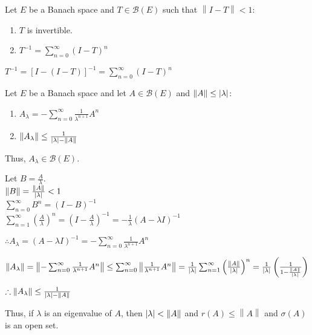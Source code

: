 \documentclass[letterpaper,12pt,fleqn]{article}
\renewcommand{\l}{\lambda}
\renewcommand{\o}{\sigma}
\newcommand{\p}{\rho}
\newcommand{\mb}{\mathcal{B}}
\newcommand{\norm}[1]{\left\|#1\right\|}
\begin{document}
\begin{corollary}
  Let $E$ be a Banach space and $T\in\mb(E)$ such that $\norm{I-T}<1$:
  \begin{enumerate}
  \item $T$ is invertible.
  \item $T^{-1}=\sum_{n=0}^{\infty}(I-T)^n$
  \end{enumerate}
\end{corollary}

\begin{theproof}
  $T^{-1}=[I-(I-T)]^{-1}=\sum_{n=0}^{\infty}(I-T)^n$
\end{theproof}

\begin{theorem}
  Let $E$ be a Banach space and let $A\in\mb(E)$ and $\norm{A}\le\abs{\l}$:
  \begin{enumerate}
  \item $A_{\l}=-\sum_{n=0}^{\infty}\frac{1}{\l^{n+1}}A^n$
  \item $\norm{A_{\l}}\le\frac{1}{\abs{\l}-\norm{A}}$
  \end{enumerate}
  Thus, $A_{\l}\in\mb(E)$.
\end{theorem}

\begin{theproof}
  Let $B=\frac{A}{\l}$. \\
  $\norm{B}=\frac{\norm{A}}{\abs{\l}}<1$ \\
  $\sum_{n=0}^{\infty}B^n=(I-B)^{-1}$ \\
  $\sum_{n=1}^{\infty}\left(\frac{A}{\l}\right)^n=
  \left(I-\frac{A}{\l}\right)^{-1}=-\frac{1}{\l}(A-\l I)^{-1}$
  
  $\therefore A_{\l}=(A-\l I)^{-1}=-\sum_{n=0}^{\infty}\frac{1}{\l^{n+1}}A^n$

  $\norm{A_{\l}}=\norm{-\sum_{n=0}^{\infty}\frac{1}{\l^{n+1}}A^n}\le
  \sum_{n=0}^{\infty}\norm{\frac{1}{\l^{n+1}}A^n}=
  \frac{1}{\abs{\l}}\sum_{n=1}^{\infty}\left(\frac{\norm{A}}{\abs{\l}}\right)^n=
  \frac{1}{\abs{\l}}\left(\frac{1}{1-\frac{\norm{A}}{\abs{\l}}}\right)$

  $\therefore\norm{A_{\l}}\le\frac{1}{\abs{\l}-\norm{A}}$
\end{theproof}

Thus, if $\l$ is an eigenvalue of $A$, then $\abs{\l}<\norm{A}$ and
$r(A)\le\norm{A}$ and $\o(A)$ is an open set.

\begin{figure}[h]
  \setlength{\leftskip}{1in}
\end{figure}
\end{document}
